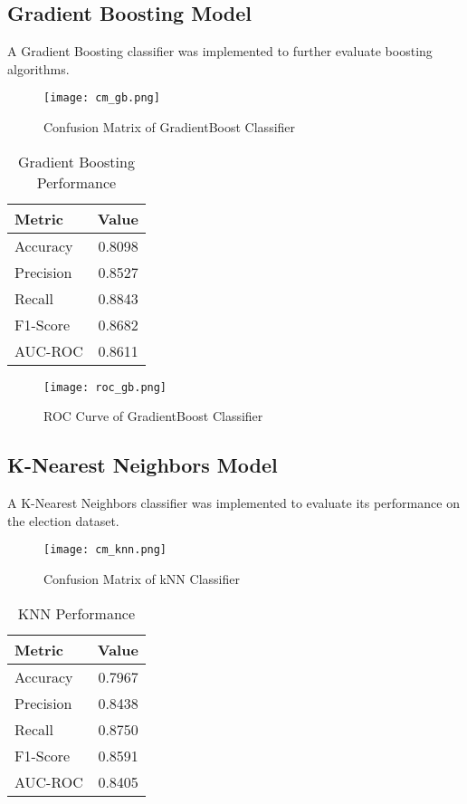 \documentclass[12pt]{article}
\begin{document}
\subsection{Gradient Boosting Model}
A Gradient Boosting classifier was implemented to further evaluate boosting algorithms.

\begin{figure}[H]
    \centering
    \texttt{[image: cm\_gb.png]}
    \caption{Confusion Matrix of GradientBoost Classifier}
    \label{fig:example}
\end{figure}

\begin{table}[H]
\centering
\caption{Gradient Boosting Performance}
\label{tab:gb_perf}
\begin{tabular}{lr}
\toprule
\textbf{Metric} & \textbf{Value} \\
\midrule
Accuracy & 0.8098 \\
Precision & 0.8527 \\
Recall & 0.8843 \\
F1-Score & 0.8682 \\
AUC-ROC & 0.8611 \\
\bottomrule
\end{tabular}
\end{table}

\begin{figure}[H]
    \centering
    \texttt{[image: roc\_gb.png]}
    \caption{ROC Curve of GradientBoost Classifier}
    \label{fig:example}
\end{figure}



\subsection{K-Nearest Neighbors Model}
A K-Nearest Neighbors classifier was implemented to evaluate its performance on the election dataset.

\begin{figure}[H]
    \centering
    \texttt{[image: cm\_knn.png]}
    \caption{Confusion Matrix of kNN Classifier}
    \label{fig:example}
\end{figure}

\begin{table}[H]
\centering
\caption{KNN Performance}
\label{tab:knn_perf}
\begin{tabular}{lr}
\toprule
\textbf{Metric} & \textbf{Value} \\
\midrule
Accuracy & 0.7967 \\
Precision & 0.8438 \\
Recall & 0.8750 \\
F1-Score & 0.8591 \\
AUC-ROC & 0.8405 \\
\bottomrule
\end{tabular}
\end{table}
\end{document}
